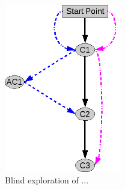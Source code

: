 \begin{figure}[htp]
 \centering
 \includegraphics[width=2in]{../img/blind-exploration-tree.png}
 \caption{Blind exploration of ...}
 \label{fig:blind-exploration-tree}
\end{figure}